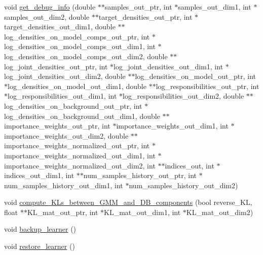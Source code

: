 \begin{DoxyCompactItemize}
void \hyperlink{classVIPS__PythonWrapper_a64a647b24326d512082dbb60932eaa29}{get\+\_\+debug\+\_\+info} (double $\ast$$\ast$samples\+\_\+out\+\_\+ptr, int $\ast$samples\+\_\+out\+\_\+dim1, int $\ast$samples\+\_\+out\+\_\+dim2, double $\ast$$\ast$target\+\_\+densities\+\_\+out\+\_\+ptr, int $\ast$target\+\_\+densities\+\_\+out\+\_\+dim1, double $\ast$$\ast$log\+\_\+densities\+\_\+on\+\_\+model\+\_\+comps\+\_\+out\+\_\+ptr, int $\ast$log\+\_\+densities\+\_\+on\+\_\+model\+\_\+comps\+\_\+out\+\_\+dim1, int $\ast$log\+\_\+densities\+\_\+on\+\_\+model\+\_\+comps\+\_\+out\+\_\+dim2, double $\ast$$\ast$log\+\_\+joint\+\_\+densities\+\_\+out\+\_\+ptr, int $\ast$log\+\_\+joint\+\_\+densities\+\_\+out\+\_\+dim1, int $\ast$log\+\_\+joint\+\_\+densities\+\_\+out\+\_\+dim2, double $\ast$$\ast$log\+\_\+densities\+\_\+on\+\_\+model\+\_\+out\+\_\+ptr, int $\ast$log\+\_\+densities\+\_\+on\+\_\+model\+\_\+out\+\_\+dim1, double $\ast$$\ast$log\+\_\+responsibilities\+\_\+out\+\_\+ptr, int $\ast$log\+\_\+responsibilities\+\_\+out\+\_\+dim1, int $\ast$log\+\_\+responsibilities\+\_\+out\+\_\+dim2, double $\ast$$\ast$log\+\_\+densities\+\_\+on\+\_\+background\+\_\+out\+\_\+ptr, int $\ast$log\+\_\+densities\+\_\+on\+\_\+background\+\_\+out\+\_\+dim1, double $\ast$$\ast$importance\+\_\+weights\+\_\+out\+\_\+ptr, int $\ast$importance\+\_\+weights\+\_\+out\+\_\+dim1, int $\ast$importance\+\_\+weights\+\_\+out\+\_\+dim2, double $\ast$$\ast$importance\+\_\+weights\+\_\+normalized\+\_\+out\+\_\+ptr, int $\ast$importance\+\_\+weights\+\_\+normalized\+\_\+out\+\_\+dim1, int $\ast$importance\+\_\+weights\+\_\+normalized\+\_\+out\+\_\+dim2, int $\ast$$\ast$indices\+\_\+out, int $\ast$indices\+\_\+out\+\_\+dim1, int $\ast$$\ast$num\+\_\+samples\+\_\+history\+\_\+out\+\_\+ptr, int $\ast$num\+\_\+samples\+\_\+history\+\_\+out\+\_\+dim1, int $\ast$num\+\_\+samples\+\_\+history\+\_\+out\+\_\+dim2)
\item 
void \hyperlink{classVIPS__PythonWrapper_a8d258a474d63f442b89358c1793ccf7e}{compute\+\_\+\+K\+Ls\+\_\+between\+\_\+\+G\+M\+M\+\_\+and\+\_\+\+D\+B\+\_\+components} (bool reverse\+\_\+\+KL, float $\ast$$\ast$K\+L\+\_\+mat\+\_\+out\+\_\+ptr, int $\ast$K\+L\+\_\+mat\+\_\+out\+\_\+dim1, int $\ast$K\+L\+\_\+mat\+\_\+out\+\_\+dim2)
\item 
void \hyperlink{classVIPS__PythonWrapper_a007140eac0ea0ea69de16a7eb8c13293}{backup\+\_\+learner} ()
\item 
void \hyperlink{classVIPS__PythonWrapper_a3819321597ef3f522bd577f479ff81b0}{restore\+\_\+learner} ()
\end{DoxyCompactItemize}

